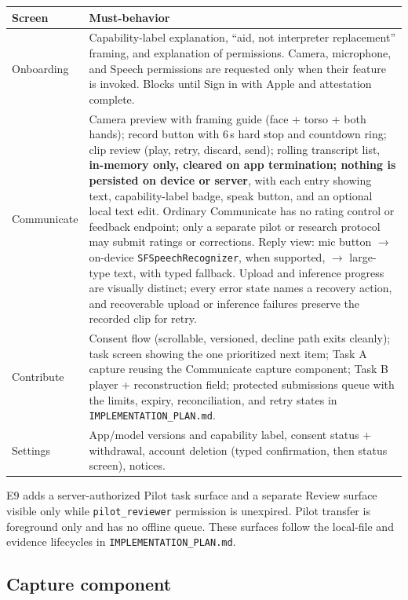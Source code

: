 \documentclass[11pt]{article}
\newcommand{\code}[1]{\texttt{#1}}
\begin{document}
\begin{center}
\begin{tabularx}{\textwidth}{@{}P{3.2cm}Y@{}}
\toprule
Screen & Must-behavior \\
\midrule
Onboarding & Capability-label explanation, ``aid, not interpreter replacement''
framing, and explanation of permissions. Camera, microphone, and Speech permissions
are requested only when their feature is invoked. Blocks until Sign in with Apple and
attestation complete. \\
Communicate & Camera preview with framing guide (face + torso + both hands); record
button with 6\,s hard stop and countdown ring; clip review (play, retry, discard,
send); rolling transcript list, \textbf{in-memory only, cleared on app
termination; nothing is persisted on device or server}, with each entry showing text,
capability-label badge, speak button, and an optional local text edit. Ordinary
Communicate has no rating control or feedback endpoint; only a separate pilot or
research protocol may submit ratings or corrections. Reply view: mic button $\to$ on-device
\code{SFSpeechRecognizer}, when supported, $\to$ large-type text, with typed fallback.
Upload and inference progress are
visually distinct; every error state names a recovery action, and recoverable upload
or inference failures preserve the recorded clip for retry. \\
Contribute & Consent flow (scrollable, versioned, decline path exits cleanly); task
screen showing the one prioritized next item; Task A capture reusing the Communicate
capture component; Task B player + reconstruction field; protected submissions queue
with the limits, expiry, reconciliation, and retry states in
\code{IMPLEMENTATION\_PLAN.md}. \\
Settings & App/model versions and capability label, consent status + withdrawal,
account deletion (typed confirmation, then status screen), notices. \\
\bottomrule
\end{tabularx}
\end{center}

E9 adds a server-authorized Pilot task surface and a separate Review surface visible
only while \code{pilot\_reviewer} permission is unexpired. Pilot transfer is foreground
only and has no offline queue. These surfaces follow the local-file and evidence
lifecycles in \code{IMPLEMENTATION\_PLAN.md}.

\subsection{Capture component}
\end{document}
